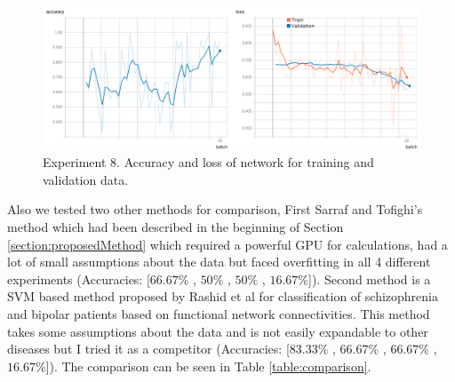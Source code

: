 \documentclass[preprint,12pt]{elsarticle}
\begin{document}
\begin{figure}
\includegraphics[width=\linewidth]{images/tests_8}
\caption{Experiment 8. Accuracy and loss of network for training and validation data.}
\label{fig:tests_8}
\end{figure}



Also we tested two other methods for comparison, First Sarraf and Tofighi's method \cite{Sarraf2016} which had been described in the beginning of Section \ref{section:proposedMethod} which required a powerful GPU for calculations, had a lot of small assumptions about the data but faced overfitting in all 4 different experiments (Accuracies: [$66.67\%$ , $50\%$ , $50\%$ , $16.67\%$]). Second method is a SVM based method proposed by Rashid et al \cite{Rashid2016} for classification of schizophrenia and bipolar patients based on functional network connectivities. This method takes some assumptions about the data and is not easily expandable to other diseases but I tried it as a competitor (Accuracies: [$83.33\%$ , $66.67\%$ , $66.67\%$ , $16.67\%$]). The comparison can be seen in Table \ref{table:comparison}.



\begin{table}
	\caption{Comparison of the proposed method with 2 other rivals}
	\label{table:comparison}
\end{table}
\end{document}
